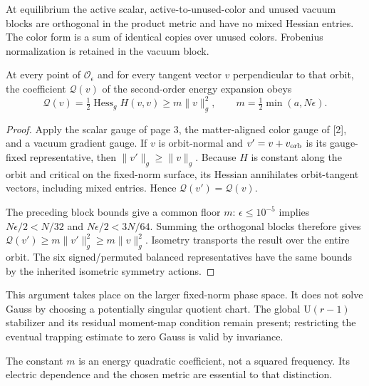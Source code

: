 \documentclass[11pt,a4paper]{article}
\begin{document}
At equilibrium the active scalar, active-to-unused-color and unused vacuum blocks are orthogonal in the product metric and have no mixed Hessian entries. The color form is a sum of identical copies over unused colors. Frobenius normalization is retained in the vacuum block.

\begin{lemma}\label{lem:normal}
At every point of $\mathcal O_\epsilon$ and for every tangent vector $v$ perpendicular to that orbit, the coefficient $\mathcal Q(v)$ of the second-order energy expansion obeys
\[
\boxed{\mathcal Q(v)=\tfrac12\operatorname{Hess}_g H(v,v)
\ge m\|v\|_g^2,\qquad m=\tfrac12\min(a,N\epsilon).}
\]
\end{lemma}
\begin{proof}
Apply the scalar gauge of page 3, the matter-aligned color gauge of [2], and a vacuum gradient gauge. If $v$ is orbit-normal and $v'=v+v_{\rm orb}$ is its gauge-fixed representative, then $\|v'\|_g\ge\|v\|_g$. Because $H$ is constant along the orbit and critical on the fixed-norm surface, its Hessian annihilates orbit-tangent vectors, including mixed entries. Hence $\mathcal Q(v')=\mathcal Q(v)$.

The preceding block bounds give a common floor $m$: $\epsilon\le10^{-5}$ implies $N\epsilon/2<N/32$ and $N\epsilon/2<3N/64$. Summing the orthogonal blocks therefore gives $\mathcal Q(v')\ge m\|v'\|_g^2\ge m\|v\|_g^2$. Isometry transports the result over the entire orbit. The six signed/permuted balanced representatives have the same bounds by the inherited isometric symmetry actions.
\end{proof}
This argument takes place on the larger fixed-norm phase space. It does not solve Gauss by choosing a potentially singular quotient chart. The global $\mathrm U(r-1)$ stabilizer and its residual moment-map condition remain present; restricting the eventual trapping estimate to zero Gauss is valid by invariance.

The constant $m$ is an energy quadratic coefficient, not a squared frequency. Its electric dependence and the chosen metric are essential to that distinction.
\newpage
\end{document}
